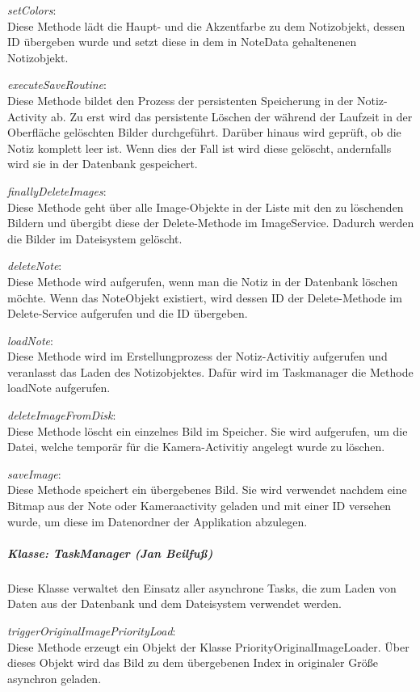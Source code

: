 \textit{setColors}:\\
Diese Methode lädt die Haupt- und die Akzentfarbe zu dem Notizobjekt, dessen ID übergeben wurde und setzt diese in dem in NoteData gehaltenenen Notizobjekt.

\textit{executeSaveRoutine}:\\
Diese Methode bildet den Prozess der persistenten Speicherung in der Notiz-Activity ab. Zu erst wird das persistente Löschen der während der Laufzeit in der Oberfläche gelöschten Bilder durchgeführt. Darüber hinaus wird geprüft, ob die Notiz komplett leer ist. Wenn dies der Fall ist wird diese gelöscht, andernfalls wird sie in der Datenbank gespeichert. 

\textit{finallyDeleteImages}:\\
Diese Methode geht über alle Image-Objekte in der Liste mit den zu löschenden Bildern und übergibt diese der Delete-Methode im ImageService. Dadurch werden die Bilder im Dateisystem gelöscht.

\textit{deleteNote}:\\
Diese Methode wird aufgerufen, wenn man die Notiz in der Datenbank löschen möchte. Wenn das NoteObjekt existiert, wird dessen ID der Delete-Methode im Delete-Service aufgerufen und die ID übergeben.

\textit{loadNote}:\\
Diese Methode wird im Erstellungprozess der Notiz-Activitiy aufgerufen und veranlasst das Laden des Notizobjektes. Dafür wird im Taskmanager die Methode loadNote aufgerufen.

\textit{deleteImageFromDisk}:\\
Diese Methode löscht ein einzelnes Bild im Speicher. Sie wird aufgerufen, um die Datei, welche temporär für die Kamera-Activitiy angelegt wurde zu löschen. 

\textit{saveImage}:\\
 Diese Methode speichert ein übergebenes Bild. Sie wird verwendet nachdem eine Bitmap aus der Note oder Kameraactivity geladen und mit einer ID versehen wurde, um diese im Datenordner der Applikation abzulegen.

\subparagraph*{Klasse: TaskManager (Jan Beilfuß)}
Diese Klasse verwaltet den Einsatz aller asynchrone Tasks, die zum Laden von Daten aus der Datenbank und dem Dateisystem verwendet werden. 

\textit{triggerOriginalImagePriorityLoad}:\\
Diese Methode erzeugt ein Objekt der Klasse PriorityOriginalImageLoader. Über dieses Objekt wird das Bild zu dem übergebenen Index in originaler Größe asynchron geladen.

